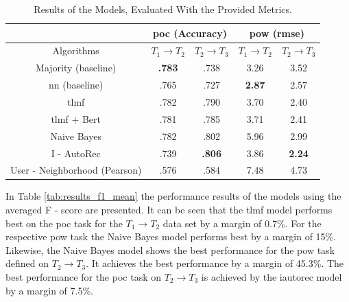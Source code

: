 \begin{table}[h!]
    \centering
    \begin{tabular}{|c|c|c|c|c|}
    \hline
     & \multicolumn{2}{|c|}{\acrshort{poc} (Accuracy)} & \multicolumn{2}{|c|}{\acrshort{pow} (\acrshort{rmse})} \\
     \hline
    Algorithms & $T_1 \to T_2$ & $T_2 \to T_3$ & $T_1 \to T_2$ & $T_2 \to T_3$\\
    \hline  Majority (baseline) & \textbf{.783} & .738 & 3.26 & 3.52 \\
    \acrshort{nn} (baseline) & .765 & .727 & \textbf{2.87} & 2.57\\
    \acrshort{tlmf} & .782 & .790 & 3.70 & 2.40 \\
    \acrshort{tlmf} + Bert & .781 & .785 & 3.71 & 2.41\\
    Naive Bayes & .782 & .802 & 5.96 & 2.99 \\
    I - AutoRec & .739 & \textbf{.806} & 3.86 & \textbf{2.24}\\
    User - Neighborhood (Pearson) & .576 & .584 & 7.48 & 4.73\\
    \hline
    \end{tabular}
    \caption{Results of the Models, Evaluated With the Provided Metrics.}
    \label{tab:results}
\end{table}
\noindent In Table \ref{tab:results_f1_mean} the performance results of the models using the averaged F - score are presented. It can be seen that the \acrshort{tlmf} model performs best on the \acrshort{poc} task for the $T_1 \to T_2$ data set by a margin of 0.7\%. For the respective \acrshort{pow} task the Naive Bayes model performs best by a margin of 15\%. \\
Likewise, the Naive Bayes model shows the best performance for the \acrshort{pow} task defined on $T_2 \to T_3$. It achieves the best performance by a margin of 45.3\%. The best performance for the \acrshort{poc} task on $T_2 \to T_3$ is achieved by the \acrshort{iautorec} model by a margin of 7.5\%.

